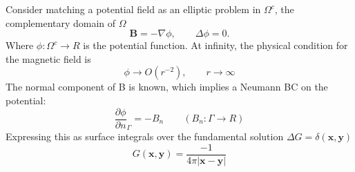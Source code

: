 \documentclass[11pt]{article}
\newcommand{\X}{\mathbf{x}}
\newcommand{\Y}{\mathbf{y}}
\newcommand{\PD}{\partial}
\begin{document}
Consider matching a potential field as an elliptic problem in $\Omega^c$, the complementary domain of $\Omega$
\begin{equation}
  \mathbf{B} = -\nabla \phi, \qquad \Delta \phi = 0.
\end{equation}
Where $\phi: \Omega^c \rightarrow R$ is the potential function. At infinity, the physical condition for the magnetic field is
\begin{equation}
  \phi \rightarrow O(r^{-2}), \qquad r \rightarrow \infty
\end{equation}
The normal component of B is known, which implies a Neumann BC on the potential:
\begin{equation}
  \frac{\PD \phi}{\PD n}_{\Gamma} = - B_n \qquad (B_n: \Gamma \rightarrow R)
\end{equation}
Expressing this as surface integrals over the fundamental solution $\Delta G = \delta(\X,\Y)$
\begin{equation}
  G(\X,\Y) = \frac{-1}{4 \pi |\X-\Y|}
\end{equation}
\end{document}
